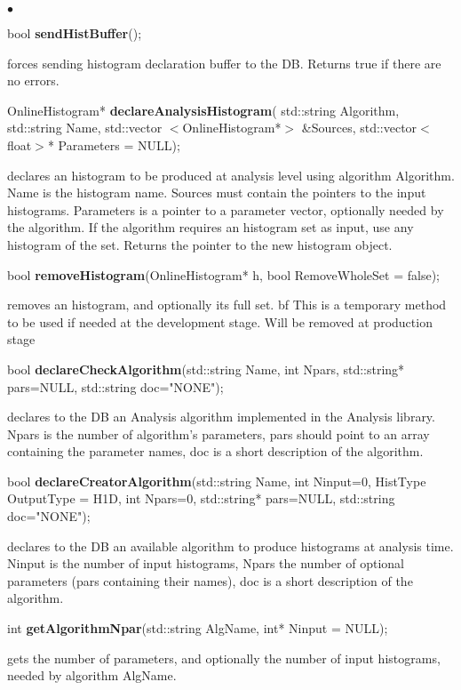 \documentclass{lhcbnote}
\begin{document}
\begin{list}{$\bullet$}{}
\item bool {\bf sendHistBuffer}();

forces sending histogram declaration buffer to the DB. Returns true if
there are no errors.

\item OnlineHistogram* {\bf declareAnalysisHistogram}( std::string 
Algorithm, std::string Name, std::vector $<$OnlineHistogram*$>$
\&Sources, std::vector$<$float$>$* Parameters = NULL);

declares an histogram to be produced at analysis
level using algorithm Algorithm. Name is the histogram name. Sources
must contain the pointers to the input histograms. Parameters is a
pointer to a parameter vector, optionally needed by the algorithm. If
the algorithm requires an histogram set as input, use any histogram of the
set. Returns the pointer to the new histogram object.
 

\item bool {\bf removeHistogram}(OnlineHistogram* h,
		       bool RemoveWholeSet = false);

removes an histogram, and optionally its full set. {bf This is
a temporary method to be used if needed at the development stage. Will
be removed at production stage} 

\item  bool {\bf declareCheckAlgorithm}(std::string Name, 
			     int Npars, 
			     std::string* pars=NULL, 
			     std::string doc="NONE");

declares to the DB an Analysis algorithm implemented in the Analysis
library. Npars is the number of algorithm's parameters, pars should
point to an array containing the parameter names, doc is a short
description of the algorithm.


\item  bool {\bf declareCreatorAlgorithm}(std::string Name, 
			       int Ninput=0, 
			       HistType OutputType = H1D,
			       int Npars=0, 
			       std::string* pars=NULL,
	                       std::string doc="NONE");

declares to the DB an available algorithm to produce histograms at
analysis time. Ninput is the number of input histograms, Npars the
number of optional parameters (pars containing their names), doc is a short
description of the algorithm.


\item  int {\bf getAlgorithmNpar}(std::string AlgName, int* Ninput = NULL);

gets the number of parameters, and
optionally the number of input histograms, needed by algorithm AlgName.



\end{list}
\end{document}
